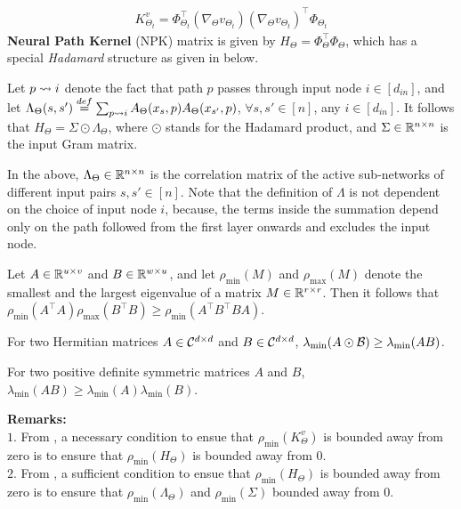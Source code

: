 \begin{align}
K^{v}_{\Theta_t}=\Phi^\top_{\Theta_t}(\nabla_{\Theta} v_{\Theta_t})(\nabla_{\Theta} v_{\Theta_t})^\top \Phi_{\Theta_t}
\end{align}
\textbf{Neural Path Kernel} (NPK) matrix is given by $H_{\Theta}=\Phi^\top_{\Theta}\Phi_{\Theta}$, which has a special \emph{Hadamard} structure as given in  below.
\begin{lemma}\label{lm:npk}
Let $p\rightsquigarrow i$ denote the fact that path $p$ passes through input node $i\in[d_{in}]$, and let $\Lambda_{\Theta}(s,s')\stackrel{def}{=}\sum_{p\rightsquigarrow i} A_{\Theta}(x_s,p) A_{\Theta}(x_{s'},p)$, $\forall s,s'\in[n]$, any $i\in [d_{in}]$. It follows that $H_{\Theta}= \Sigma\odot\Lambda_{\Theta}$, where $\odot$ stands for the Hadamard product, and $\Sigma \in \mathbb{R}^{n\times n}$ is the input Gram matrix.
\end{lemma}
In the  above, $\Lambda_{\Theta}\in\mathbb{R}^{n\times n}$ is the correlation matrix of the active sub-networks of different input pairs $s,s'\in[n]$. Note that the definition of $\Lambda$ is not dependent on the choice of input node $i$, because, the terms inside the summation depend only on the path followed from the first layer onwards and excludes the input node.
\begin{lemma}\label{lm:nec}
Let $A\in\mathbb{R}^{u\times v}$ and $B\in\mathbb{R}^{w\times u}$, and let $\rho_{\min}(M)$ and $\rho_{\max}(M)$ denote the smallest and the largest eigenvalue of a matrix $M\in\mathbb{R}^{r\times r}$. Then it follows that $\rho_{\min}(A^\top A)\rho_{\max}(B^\top B)\geq \rho_{\min}(A^\top B^\top BA)$.
\end{lemma}
\begin{theorem} 
For two Hermitian matrices $A\in \mathcal{C}^{d\times d}$ and $B\in \mathcal{C}^{d\times d}$, $\lambda_{\min}(A\odot\mathcal{B})\geq \lambda_{\min} (AB)$. 
\end{theorem}
\begin{lemma}\label{lm:suf}
For two positive definite symmetric matrices $A$ and $B$, $\lambda_{\min}(AB)\geq \lambda_{\min} (A)\lambda_{\min}(B)$. 
\end{lemma}
\textbf{Remarks:}\\
$1.$ From , a necessary condition to ensue that $\rho_{\min}(K^v_{\Theta})$ is bounded away from zero is to ensure that $\rho_{\min}(H_{\Theta})$ is bounded away from $0$. \\
$2.$ From , a sufficient condition to ensue that $\rho_{\min}(H_{\Theta})$ is bounded away from zero is to ensure that $\rho_{\min}(\Lambda_{\Theta})$ and $\rho_{\min}(\Sigma)$ bounded away from $0$.

